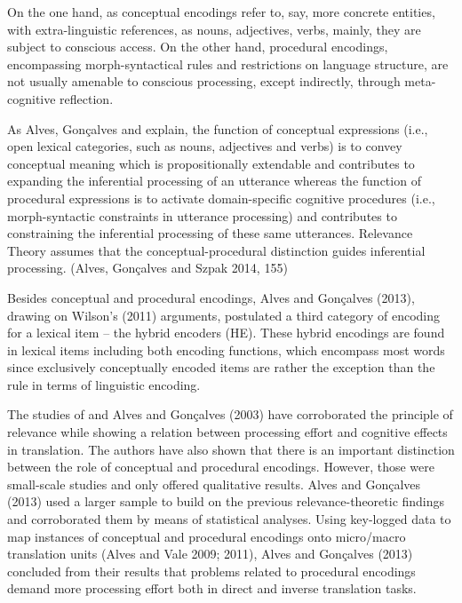 \documentclass[output=paper]{langsci/langscibook}
\begin{document}
On the one hand, as conceptual encodings refer to, say, more concrete entities, with extra-linguistic references, as nouns, adjectives, verbs, mainly, they are subject to conscious access. On the other hand, procedural encodings, encompassing morph-syntactical rules and restrictions on language structure, are not usually amenable to conscious processing, except indirectly, through meta-cognitive reflection. 



As Alves, Gonçalves and \citet{Szpak2014} explain, the function of conceptual expressions (i.e., open lexical categories, such as nouns, adjectives and verbs) is to convey conceptual meaning which is propositionally extendable and contributes to expanding the inferential processing of an utterance whereas the function of procedural expressions is to activate domain-specific cognitive procedures (i.e., morph-syntactic constraints in utterance processing) and contributes to constraining the inferential processing of these same utterances. Relevance Theory assumes that the conceptual-procedural distinction guides inferential processing. (Alves, Gonçalves and Szpak 2014, 155)  



Besides conceptual and procedural encodings, Alves and Gonçalves (2013), drawing on Wilson’s (2011) arguments, postulated a third category of encoding for a lexical item – the hybrid encoders (HE). These hybrid encodings are found in lexical items including both encoding functions, which encompass most words since exclusively conceptually encoded items are rather the exception than the rule in terms of linguistic encoding.



The studies of \citet{Alves2007} and Alves and Gonçalves (2003) have corroborated the principle of relevance while showing a relation between processing effort and cognitive effects in translation. The authors have also shown that there is an important distinction between the role of conceptual and procedural encodings.  However, those were small-scale studies and only offered qualitative results. Alves and Gonçalves (2013) used a larger sample to build on the previous relevance-theoretic findings and corroborated them by means of statistical analyses. Using key-logged data to map instances of conceptual and procedural encodings onto micro/macro translation units (Alves and Vale 2009; 2011), Alves and Gonçalves (2013) concluded from their results that problems related to procedural encodings demand more processing effort both in direct and inverse translation tasks.
\end{document}
